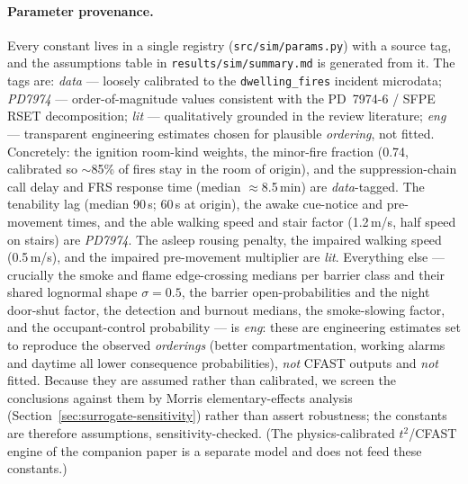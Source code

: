 \paragraph{Parameter provenance.}
Every constant lives in a single registry (\texttt{src/sim/params.py}) with a
source tag, and the assumptions table in \texttt{results/sim/summary.md} is
generated from it. The tags are: \emph{data} --- loosely calibrated to the
\texttt{dwelling\_fires} incident microdata; \emph{PD7974} --- order-of-magnitude
values consistent with the PD~7974-6 / SFPE RSET decomposition; \emph{lit} ---
qualitatively grounded in the review literature; \emph{eng} --- transparent
engineering estimates chosen for plausible \emph{ordering}, not fitted.
Concretely: the ignition room-kind weights, the minor-fire fraction (0.74,
calibrated so $\sim$85\% of fires stay in the room of origin), and the
suppression-chain call delay and FRS response time (median $\approx$8.5\,min) are
\emph{data}-tagged. The tenability lag (median 90\,s; 60\,s at origin), the awake
cue-notice and pre-movement times, and the able walking speed and stair factor
(1.2\,m/s, half speed on stairs) are \emph{PD7974}.
The asleep rousing penalty, the impaired walking speed (0.5\,m/s), and the
impaired pre-movement multiplier are \emph{lit}. Everything else --- crucially the smoke and
flame edge-crossing medians per barrier class and their shared lognormal shape
$\sigma=0.5$, the barrier open-probabilities and the night door-shut factor, the
detection and burnout medians, the smoke-slowing factor, and the
occupant-control probability --- is
\emph{eng}: these are engineering estimates set to reproduce the observed
\emph{orderings} (better compartmentation, working alarms and daytime all lower
consequence probabilities), \emph{not} CFAST outputs and \emph{not} fitted.
Because they are assumed rather than calibrated, we screen the conclusions
against them by Morris elementary-effects analysis
(Section~\ref{sec:surrogate-sensitivity}) rather than assert robustness; the
constants are therefore assumptions, sensitivity-checked. (The
physics-calibrated $t^2$/CFAST engine of the companion paper is a separate model
and does not feed these constants.)

